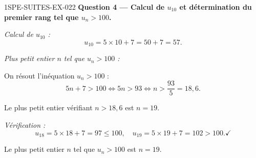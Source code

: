 \begin{corrige}{1SPE-SUITES-EX-022}
\medskip
\textbf{Question 4 — Calcul de $u_{10}$ et détermination du premier rang tel que $u_n > 100$.}

\textit{Calcul de $u_{10}$ :}
\[
  u_{10} = 5 \times 10 + 7 = 50 + 7 = 57.
\]

\textit{Plus petit entier $n$ tel que $u_n > 100$ :}

On résout l'inéquation $u_n > 100$ :
\[
  5n + 7 > 100 \iff 5n > 93 \iff n > \frac{93}{5} = 18{,}6.
\]


Le plus petit entier vérifiant $n > 18{,}6$ est $n = 19$.

\textit{Vérification :}
\[
  u_{18} = 5 \times 18 + 7 = 97 \leq 100, \quad u_{19} = 5 \times 19 + 7 = 102 > 100. \checkmark
\]

Le plus petit entier $n$ tel que $u_n > 100$ est $\boxed{n = 19}$.

\end{corrige}
